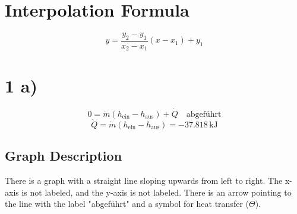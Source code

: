 \section*{Interpolation Formula}
\begin{equation}
y = \frac{y_2 - y_1}{x_2 - x_1} (x - x_1) + y_1
\end{equation}

\section*{1 a)}
\begin{equation}
0 = \dot{m} (h_{\text{ein}} - h_{\text{aus}}) + \dot{Q} \quad \text{abgeführt}
\end{equation}
\begin{equation}
\dot{Q} = \dot{m} (h_{\text{ein}} - h_{\text{aus}}) = -37.818 \, \text{kJ}
\end{equation}

\subsection*{Graph Description}
There is a graph with a straight line sloping upwards from left to right. The x-axis is not labeled, and the y-axis is not labeled. There is an arrow pointing to the line with the label "abgeführt" and a symbol for heat transfer (\(\Theta\)).